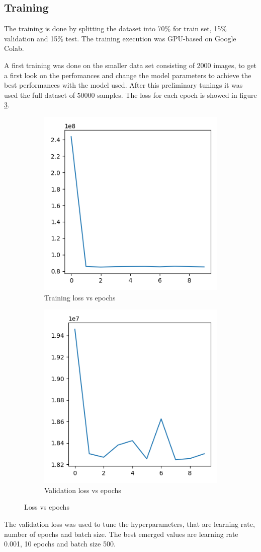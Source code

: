 \subsection{Training}
The training is done by splitting the dataset into 70\% for train set, 15\% validation and 15\% test. The training execution was GPU-based on Google Colab.

A first training was done on the smaller data set consisting of 2000 images, to get a first look on the perfomances and change the model parameters to achieve the best performances with the model used. After this preliminary tunings it was used the full dataset of 50000 samples. The loss for each epoch is showed in figure \ref{fig:ValLoss}.


\begin{figure}[h!]
	\centering
	\begin{subfigure}{.5\textwidth}
		\centering
		\includegraphics[width=0.4\linewidth]{./ImageFiles/Training/train-cost}
		\caption{Training loss vs epochs}
		\label{fig:TrainLoss}
	\end{subfigure}%
	\begin{subfigure}{.5\textwidth}
		\centering
		\includegraphics[width=0.4\linewidth]{./ImageFiles/Training/val-cost}
		\caption{Validation loss vs epochs}
		\label{fig:ValLoss}
	\end{subfigure}
	\caption{Loss vs epochs}
	\label{fig:ValLoss}
\end{figure}

The validation loss was used to tune the hyperparameters, that are learning rate, number of epochs and batch size. The best emerged values are learning rate 0.001, 10 epochs and batch size 500.